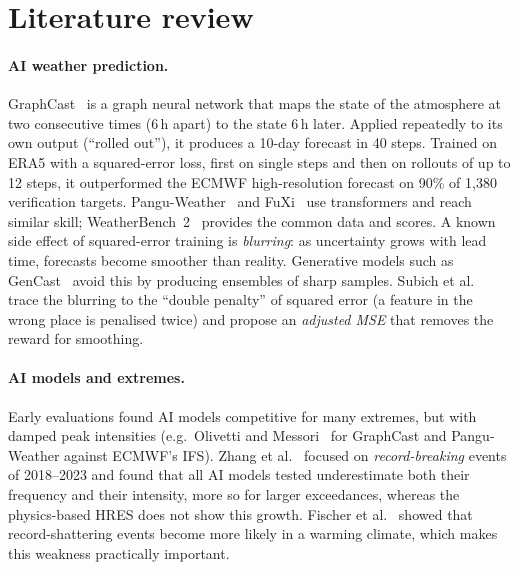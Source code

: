 \documentclass{article}
\begin{document}
\section{Literature review}
\label{sec:lit}

\paragraph{AI weather prediction.}
GraphCast~\cite{lam2023graphcast} is a graph neural network that maps the state of the atmosphere at two
consecutive times (6\,h apart) to the state 6\,h later. Applied repeatedly to its own output (``rolled out''),
it produces a 10-day forecast in 40 steps. Trained on ERA5 with a squared-error loss, first on single steps and then on rollouts of up to 12 steps,
it outperformed the ECMWF high-resolution forecast on 90\% of 1{,}380 verification targets. Pangu-Weather~\cite{bi2023pangu} and FuXi~\cite{chen2023fuxi} use
transformers and reach similar skill; WeatherBench~2~\cite{rasp2024wb2} provides the common data and scores. A known side effect
of squared-error training is \emph{blurring}: as uncertainty grows with lead time, forecasts become smoother than
reality. Generative models such as GenCast~\cite{price2025gencast} avoid this by producing ensembles of sharp samples.
Subich et al.~\cite{subich2025amse} trace the blurring to the ``double penalty'' of squared error (a feature in the wrong place is penalised twice) and propose an
\emph{adjusted MSE} that removes the reward for smoothing.

\paragraph{AI models and extremes.}
Early evaluations found AI models competitive for many extremes, but with damped peak intensities
(e.g.\ Olivetti and Messori~\cite{olivetti2024extremes} for GraphCast and Pangu-Weather against ECMWF's IFS).
Zhang et al.~\cite{zhang2026records} focused on \emph{record-breaking} events of 2018--2023 and found that all AI models
tested underestimate both their frequency and their intensity, more so for larger exceedances, whereas the physics-based
HRES does not show this growth. Fischer et al.~\cite{fischer2021shattering} showed that record-shattering
events become more likely in a warming climate, which makes this weakness practically important.
\end{document}
